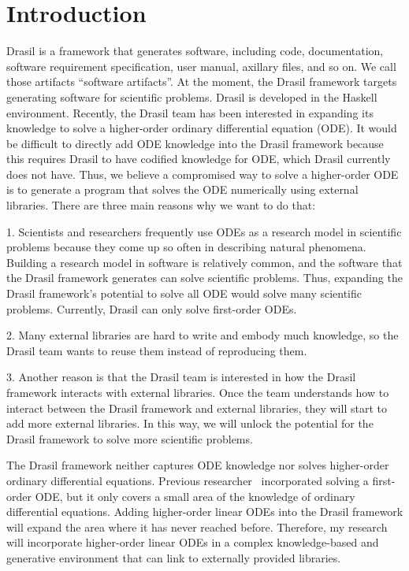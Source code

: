\chapter{Introduction}
Drasil is a framework that generates software, including code, documentation, software requirement specification, user manual, axillary files, and so on. We call those artifacts ``software artifacts''. At the moment, the Drasil framework targets generating software for scientific problems. Drasil is developed in the Haskell environment. Recently, the Drasil team has been interested in expanding its knowledge to solve a higher-order ordinary differential equation (ODE). It would be difficult to directly add ODE knowledge into the Drasil framework because this requires Drasil to have codified knowledge for ODE, which Drasil currently does not have. Thus, we believe a compromised way to solve a higher-order ODE is to generate a program that solves the ODE numerically using external libraries. There are three main reasons why we want to do that:

1. Scientists and researchers frequently use ODEs as a research model in scientific problems because they come up so often in describing natural phenomena. Building a research model in software is relatively common, and the software that the Drasil framework generates can solve scientific problems. Thus, expanding the Drasil framework's potential to solve all ODE would solve many scientific problems. Currently, Drasil can only solve first-order ODEs.

2. Many external libraries are hard to write and embody much knowledge, so the Drasil team wants to reuse them instead of reproducing them.

3. Another reason is that the Drasil team is interested in how the Drasil framework interacts with external libraries. Once the team understands how to interact between the Drasil framework and external libraries, they will start to add more external libraries. In this way, we will unlock the potential for the Drasil framework to solve more scientific problems. 

The Drasil framework neither captures ODE knowledge nor solves higher-order ordinary differential equations. Previous researcher~\citep{brooks} incorporated solving a first-order ODE, but it only covers a small area of the knowledge of ordinary differential equations. Adding higher-order linear ODEs into the Drasil framework will expand the area where it has never reached before. Therefore, my research will incorporate higher-order linear ODEs in a complex knowledge-based and generative environment that can link to externally provided libraries.

